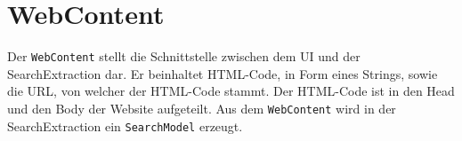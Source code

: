 
\section{WebContent}

Der \lstinline|WebContent| stellt die Schnittstelle zwischen dem UI und der SearchExtraction dar. Er beinhaltet HTML-Code, in Form eines Strings, sowie die URL, von welcher der HTML-Code stammt. Der HTML-Code ist in den Head und den Body der Website aufgeteilt.\newline
Aus dem \lstinline|WebContent| wird in der SearchExtraction ein \lstinline|SearchModel| erzeugt.

